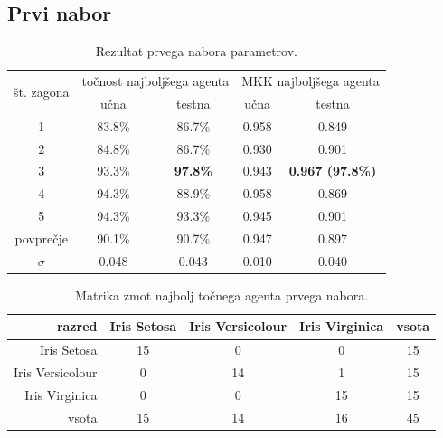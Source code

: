 \subsection{Prvi nabor}\label{subsec:dodatek-iris-prvi-nabor}
\begin{table}[H]
    \begin{center}
        \begin{tabular}{|| c | c c || c c ||}
            \hline
            \multirow{2}{*}{št. zagona} & \multicolumn{2}{c||}{točnost najboljšega agenta} & \multicolumn{2}{c||}{MKK najboljšega agenta} \\ \cline{2-5}
            & učna   & testna          & učna  & testna                  \\
            \hline
            1         & 83.8\% & 86.7\%          & 0.958 & 0.849                   \\
            \hline
            2         & 84.8\% & 86.7\%          & 0.930 & 0.901                   \\
            \hline
            3         & 93.3\% & \textbf{97.8\%} & 0.943 & \textbf{0.967 (97.8\%)} \\
            \hline
            4         & 94.3\% & 88.9\%          & 0.958 & 0.869                   \\
            \hline
            5         & 94.3\% & 93.3\%          & 0.945 & 0.901                   \\
            \hline
            povprečje & 90.1\% & 90.7\%          & 0.947 & 0.897                   \\
            \hline
            $\sigma$  & 0.048  & 0.043           & 0.010 & 0.040                   \\
            \hline
        \end{tabular}
    \end{center}
    \caption{Rezultat prvega nabora parametrov.}
    \label{tab:iris_result_1}
\end{table}

\begin{table}[H]
    \centering
    \begin{tabular}{||rcccc||}
        \hline
        razred           & Iris Setosa & Iris Versicolour & Iris Virginica & vsota \\ \hline
        Iris Setosa      & 15          & 0                & 0              & 15    \\ \hline
        Iris Versicolour & 0           & 14               & 1              & 15    \\ \hline
        Iris Virginica   & 0           & 0                & 15             & 15    \\ \hline
        vsota            & 15          & 14               & 16             & 45    \\ \hline
    \end{tabular}
    \caption{Matrika zmot najbolj točnega agenta prvega nabora.}
    \label{tab:iris_acc_1}
\end{table}

